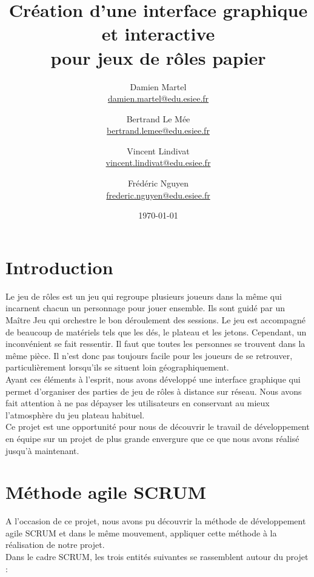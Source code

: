 \documentclass[11pt]{article}
\title{Création d'une interface graphique et interactive \\ pour jeux de rôles papier}
\author{
	Damien Martel \\ \href{mailto:damien.martel@edue.esiee.fr}{damien.martel@edu.esiee.fr} \and
	Bertrand Le Mée \\ \href{mailto:bertrand.lemee@edu.esiee.fr}{bertrand.lemee@edu.esiee.fr} \and
	Vincent Lindivat \\ \href{mailto:vincent.lindivat@edu.esiee.fr}{vincent.lindivat@edu.esiee.fr} \and
	Frédéric Nguyen \\ \href{mailto:frederic.nguyen@edu.esiee.fr}{frederic.nguyen@edu.esiee.fr}
}
\date{\today}
\begin{document}
\maketitle
\newpage
\hfill
\newpage
\tableofcontents
\newpage

\section{Introduction}

Le jeu de rôles est un jeu qui regroupe plusieurs joueurs dans la même qui incarnent chacun un personnage pour jouer ensemble. Ils sont guidé par un Maître Jeu qui orchestre le bon déroulement des sessions. Le jeu est accompagné de beaucoup de matériels tels que les dés, le plateau et les jetons. Cependant, un inconvénient se fait ressentir. Il faut que toutes les personnes se trouvent dans la même pièce. Il n'est donc pas toujours facile pour les joueurs de se retrouver, particulièrement lorsqu'ils se situent loin géographiquement. \\

Ayant ces éléments à l'esprit, nous avons développé une interface graphique qui permet d'organiser des parties de jeu de rôles à distance sur réseau. Nous avons fait attention à ne pas dépayser les utilisateurs en conservant au mieux l'atmosphère du jeu plateau habituel. \\

Ce projet est une opportunité pour nous de découvrir le travail de développement en équipe sur un projet de plus grande envergure que ce que nous avons réalisé jusqu'à maintenant.

\section{Méthode agile SCRUM}

A l'occasion de ce projet, nous avons pu découvrir la méthode de développement
 agile SCRUM  et dans le même mouvement, appliquer cette méthode à la réalisation de notre projet.\\
 
Dans le cadre SCRUM, les trois entités suivantes se rassemblent autour du projet :
\end{document}
